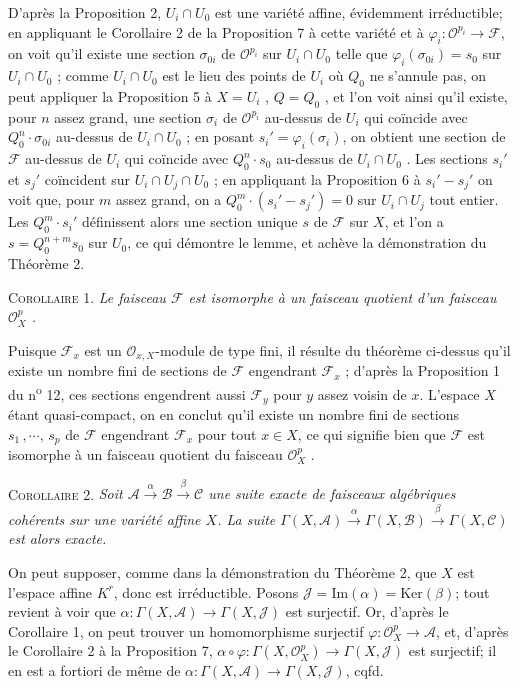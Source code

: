 D'après la Proposition 2, $U_i \cap U_0$ est une variété affine, évidemment irréductible; en appliquant le Corollaire 2 de la Proposition 7 à cette variété et à $\varphi_i : \mathcal{O}^{p_i} \to \mathcal{F}$, on voit qu'il existe une section $\sigma_{0i}$ de $\mathcal{O}^{p_i}$ sur $U_i \cap U_0$ telle que $\varphi_i(\sigma_{0i}) = s_0$ sur $U_i \cap U_0$ ; comme $U_i \cap U_0$ est le lieu des points de $U_i$ où $Q_0$ ne s'annule pas, on peut appliquer la Proposition 5 à $X = U_i$ , $Q = Q_0$ , et l'on voit ainsi qu'il existe, pour $n$ assez grand, une section $\sigma_i$ de $\mathcal{O}^{p_i}$ au-dessus de $U_i$ qui coïncide avec $Q_0^n \cdot \sigma_{0i}$ au-dessus de $U_i \cap U_0$ ; en posant $s_i' = \varphi_i(\sigma_i)$, on
obtient une section de $\mathcal{F}$ au-dessus de $U_i$ qui coïncide avec $Q_0^n \cdot s_0$ au-dessus de $U_i \cap U_0$ . Les sections $s_i'$ et $s_j'$ coïncident sur $U_i \cap U_j \cap U_0$ ; en appliquant la Proposition 6 à $s_i' - s_j'$ on voit que, pour $m$ assez grand, on a $Q_0^m \cdot (s_i' - s_j') = 0$ sur $U_i \cap U_j$ tout entier. Les $Q_0^m \cdot s_i'$ définissent alors une section unique $s$ de $\mathcal{F}$ sur $X$, et l'on a $s = Q_0^{n+m} s_0$ sur $U_0$, ce qui démontre le lemme, et achève la démonstration du Théorème 2.

\textsc{Corollaire} 1. \textit{Le faisceau $\mathcal{F}$ est isomorphe à un faisceau quotient d'un faisceau $\mathcal{O}_X^p$ .}

Puisque $\mathcal{F}_x$ est un $\mathcal{O}_{x,X}$-module de type fini, il résulte du théorème ci-dessus qu'il existe un nombre fini de sections de $\mathcal{F}$ engendrant $\mathcal{F}_x$ ; d'après la Proposition 1 du n\textsuperscript{o} 12, ces sections engendrent aussi $\mathcal{F}_y$ pour $y$ assez voisin de $x$. L'espace $X$ étant quasi-compact, on en conclut qu'il existe un nombre fini de sections $s_1 \, , \cdots , \, s_p$ de $\mathcal{F}$ engendrant $\mathcal{F}_x$ pour tout $x \in X$, ce qui signifie bien que $\mathcal{F}$ est isomorphe à un faisceau quotient du faisceau $\mathcal{O}_X^p$ .

\textsc{Corollaire} 2. \textit{Soit $\mathcal{A} \xrightarrow{\ \alpha\ } \mathcal{B} \xrightarrow{\ \beta\ } \mathcal{C}$ une suite exacte de faisceaux algébriques cohérents sur une variété affine $X$. La suite $\Gamma(X, \mathcal{A}) \xrightarrow{\ \alpha\ } \Gamma(X, \mathcal{B}) \xrightarrow{\ \beta\ } \Gamma(X, \mathcal{C})$ est alors exacte.}

On peut supposer, comme dans la démonstration du Théorème 2, que $X$ est l'espace affine $K^r$, donc est irréductible. Posons $\mathcal{J} = \mathrm{Im}(\alpha) = \mathrm{Ker}(\beta)$; tout revient à voir que $\alpha : \Gamma(X, \mathcal{A}) \to \Gamma(X, \mathcal{J})$ est surjectif. Or, d'après le Corollaire 1, on peut trouver un homomorphisme surjectif $\varphi : \mathcal{O}_X^p \to \mathcal{A}$, et, d'après le Corollaire 2 à la Proposition 7, $\alpha \circ \varphi : \Gamma(X, \mathcal{O}_X^p) \to \Gamma(X, \mathcal{J})$ est surjectif; il en est a fortiori de même de $\alpha : \Gamma(X, \mathcal{A}) \to \Gamma(X, \mathcal{J})$, cqfd.


